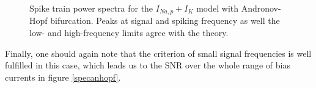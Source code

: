 \documentclass[12pt,a4paper]{article}
\begin{document}
\begin{figure}[H]
	\label{anhopfspec}
	\hspace*{-0.5cm}
	\caption{Spike train power spectra for the $I_{Na,p}+I_K$ model with Andronov-Hopf bifurcation. Peaks at signal and spiking frequency as well the low- and high-frequency limits agree with the theory.}
\end{figure}
Finally, one should again note that the criterion of small signal frequencies is well fulfilled in this case, which leads us to the SNR over the whole range of bias currents in figure \ref{specanhopf}.
\end{document}
